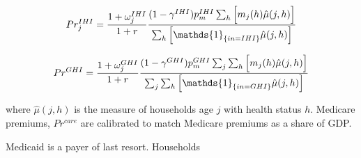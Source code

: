 \documentclass[11pt,leqno,fleqn]{article}
\newcommand{\be}{\vspace{-1em}\begin{singlespace}\begin{equation}}
\newcommand{\ee}{\end{equation}\end{singlespace}}
\newcommand{\ind}{\mathds{1}}
\begin{document}
\be Pr_j^{IHI} = \frac{1+\omega_j^{IHI}}{1+r}\frac{(1-\gamma^{IHI})p_m^{IHI}\sum_h \Big[ m_j(h)\hat{\mu}(j,h) \Big]}{\sum_h\Big[ \ind_{\{in=IHI\}}\hat{\mu}(j,h)\Big]} \notag \ee

\be Pr^{GHI} = \frac{1+\omega_j^{GHI}}{1+r}\frac{(1-\gamma^{GHI})p_m^{GHI}\sum_j \sum_h \Big[ m_j(h)\hat{\mu}(j,h) \Big]}{\sum_j \sum_h\Big[ \ind_{\{in=GHI\}}\hat{\mu}(j,h)\Big]} \notag \ee

where $\hat{\mu}(j,h)$ is the measure of households age $j$ with health status $h$. Medicare premiums, $Pr^{care}$ are calibrated to match Medicare premiums as a share of GDP.

Medicaid is a payer of last resort. Households

\clearpage



\end{document}
